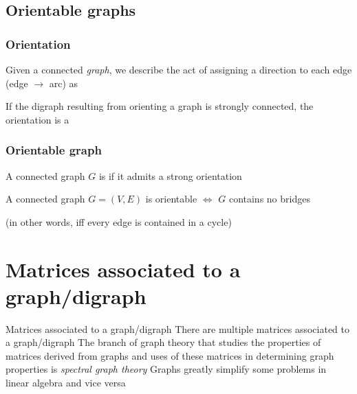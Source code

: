 \documentclass[aspectratio=169]{beamer}\usepackage[]{graphicx}\usepackage[]{xcolor}
\begin{document}
\subsection{Orientable graphs}

\begin{frame}\frametitle{Orientation}
\begin{definition}
Given a connected \emph{graph}, we describe the act of assigning a direction to each edge (edge $\rightarrow$ arc) as 
\end{definition}
\vfill
\begin{definition}
If the digraph resulting from orienting a graph is strongly connected, the orientation is a 
\end{definition}
\end{frame}
 
 
\begin{frame}\frametitle{Orientable graph}
\begin{definition}
A connected graph $G$ is  if it admits a strong orientation
\end{definition}
\vfill
\begin{theorem}
A connected graph $G=(V,E)$ is orientable $\iff$ $G$ contains no bridges
\end{theorem}
(in other words, iff every edge is contained in a cycle)
\end{frame}
 






\section{Matrices associated to a graph/digraph}

\begin{frame}{Matrices associated to a graph/digraph}
	There are multiple matrices associated to a graph/digraph
	\vfill
	The branch of graph theory that studies the properties of matrices derived from graphs and uses of these matrices in determining graph properties is \emph{spectral graph theory}
	\vfill
	Graphs greatly simplify some problems in linear algebra and vice versa
\end{frame}
\end{document}
